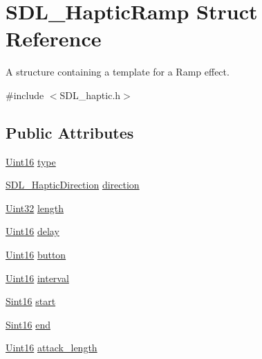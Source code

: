 \hypertarget{struct_s_d_l___haptic_ramp}{\section{S\-D\-L\-\_\-\-Haptic\-Ramp Struct Reference}
\label{struct_s_d_l___haptic_ramp}
}


A structure containing a template for a Ramp effect.  




{\ttfamily \#include $<$S\-D\-L\-\_\-haptic.\-h$>$}

\subsection*{Public Attributes}
\begin{DoxyCompactItemize}
\item 
\hyperlink{_s_d_l__stdinc_8h_a31fcc0a076c9068668173ee26d33e42b}{Uint16} \hyperlink{struct_s_d_l___haptic_ramp_aca1c2349372433822ab62f60976640aa}{type}
\item 
\hyperlink{struct_s_d_l___haptic_direction}{S\-D\-L\-\_\-\-Haptic\-Direction} \hyperlink{struct_s_d_l___haptic_ramp_a6fb6c67ccf262b8f3ec08bcdf08f9965}{direction}
\item 
\hyperlink{_s_d_l__stdinc_8h_add440eff171ea5f55cb00c4a9ab8672d}{Uint32} \hyperlink{struct_s_d_l___haptic_ramp_a57e75237507701405af2a3caf34cdb5a}{length}
\item 
\hyperlink{_s_d_l__stdinc_8h_a31fcc0a076c9068668173ee26d33e42b}{Uint16} \hyperlink{struct_s_d_l___haptic_ramp_ac9471016f41919b4a1c786bbd649a777}{delay}
\item 
\hyperlink{_s_d_l__stdinc_8h_a31fcc0a076c9068668173ee26d33e42b}{Uint16} \hyperlink{struct_s_d_l___haptic_ramp_a2027c6fd88f1ebe652c90c71410ee0bf}{button}
\item 
\hyperlink{_s_d_l__stdinc_8h_a31fcc0a076c9068668173ee26d33e42b}{Uint16} \hyperlink{struct_s_d_l___haptic_ramp_a4b89d108cfa7e96ea58b58771334c33d}{interval}
\item 
\hyperlink{_s_d_l__stdinc_8h_a9d0257032c0e146ab6121bf0122712f5}{Sint16} \hyperlink{struct_s_d_l___haptic_ramp_acc0e813ac6399290fd4a788d2471e8d4}{start}
\item 
\hyperlink{_s_d_l__stdinc_8h_a9d0257032c0e146ab6121bf0122712f5}{Sint16} \hyperlink{struct_s_d_l___haptic_ramp_a16dd3ee307795248e21ee45ba8fb4c6c}{end}
\item 
\hyperlink{_s_d_l__stdinc_8h_a31fcc0a076c9068668173ee26d33e42b}{Uint16} \hyperlink{struct_s_d_l___haptic_ramp_adbcd7ffb05016d442c73e81cc0fcbbd2}{attack\-\_\-length}

\end{DoxyCompactItemize}
